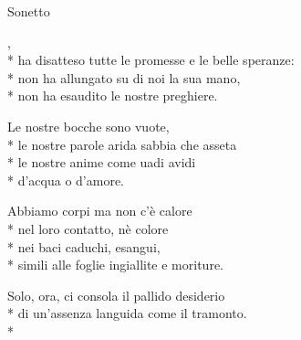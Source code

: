 \documentclass[12pt]{book}
\begin{document}
\begin{poem}{Sonetto}{}

\settowidth{\versewidth}{ha disatteso tutte le promesse e le belle speranze:}
\begin{changemargin}{-1cm}{-2cm} 
\begin{altverse}
,\\*
ha disatteso tutte le promesse e le belle speranze: \\*
non ha allungato su di noi la sua mano, \\*
non ha esaudito le nostre preghiere. 
\end{altverse}

\begin{altverse}
Le nostre bocche sono vuote, \\*
le nostre parole arida sabbia che asseta \\*
le nostre anime come uadi avidi \\*
d'acqua o d'amore. 
\end{altverse}

\begin{altverse}
Abbiamo corpi ma non c'è calore \\*
nel loro contatto, nè colore \\*
nei baci caduchi, esangui, \\*
simili alle foglie ingiallite e moriture. 
\end{altverse}

\begin{altverse}
Solo, ora, ci consola il pallido desiderio \\*
di un'assenza languida come il tramonto. \\*
\end{altverse}
\end{changemargin}
\end{poem}
\end{document}
